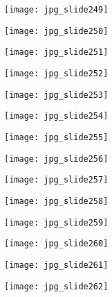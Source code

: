 \documentclass[main.tex]{subfiles}
\begin{document}
\begin{center}
\texttt{[image: jpg\_slide249]}
\end{center}

\begin{center}
\texttt{[image: jpg\_slide250]}
\end{center}

\begin{center}
\texttt{[image: jpg\_slide251]}
\end{center}

\begin{center}
\texttt{[image: jpg\_slide252]}
\end{center}

\begin{center}
\texttt{[image: jpg\_slide253]}
\end{center}

\begin{center}
\texttt{[image: jpg\_slide254]}
\end{center}

\begin{center}
\texttt{[image: jpg\_slide255]}
\end{center}

\begin{center}
\texttt{[image: jpg\_slide256]}
\end{center}

\begin{center}
\texttt{[image: jpg\_slide257]}
\end{center}

\begin{center}
\texttt{[image: jpg\_slide258]}
\end{center}

\begin{center}
\texttt{[image: jpg\_slide259]}
\end{center}

\begin{center}
\texttt{[image: jpg\_slide260]}
\end{center}

\begin{center}
\texttt{[image: jpg\_slide261]}
\end{center}

\begin{center}
\texttt{[image: jpg\_slide262]}
\end{center}
\end{document}
